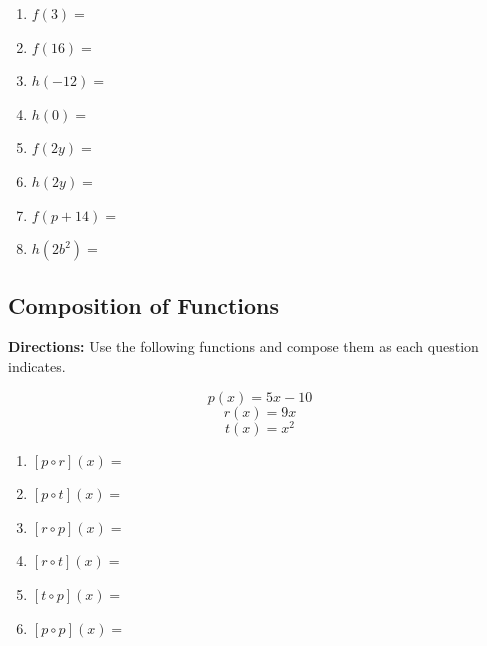 \documentclass[12pt]{article}
\begin{document}
\begin{enumerate}[resume]

	\item $f(3)=$\\
	
	\item $f(16)=$\\
	
	\item $h(-12)=$\\
	
	\item $h(0)=$\\
	
	\item $f(2y)=$\\
	
	\item $h(2y)=$\\
	
	\item $f(p+14)=$\\
	
	\item $h(2b^2)=$\\
\end{enumerate}



\subsection{Composition of Functions}

\textbf{Directions:} Use the following functions and compose them as each question indicates.

 $$p(x)=5x-10$$ $$r(x)=9x$$  $$t(x)=x^2$$
 
\begin{enumerate}[resume]

	\item $[p \circ r](x)=$\\
	
		\vspace{1cm}
	
	\item $[p \circ t](x)=$\\
				\vspace{1cm}
	
	\item $[r \circ p](x)=$\\

		\vspace{1cm}
	
	\item $[r \circ t](x)=$\\

		\vspace{1cm}
	
	\item $[t \circ p](x)=$\\

		\vspace{1cm}
	
	\item $ [p \circ p](x)=$\\

\end{enumerate}
\end{document}
